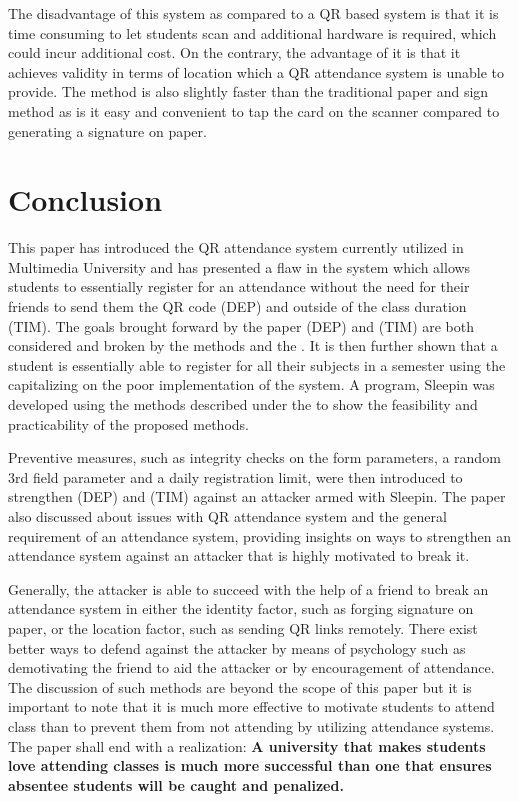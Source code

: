 \documentclass[runningheads]{llncs}
\begin{document}
The disadvantage of this system as compared to a QR based system is that it is time consuming to let students scan and additional hardware is required, which could incur additional cost.
On the contrary, the advantage of it is that it achieves validity in terms of location which a QR attendance system is unable to provide. The method is also slightly faster than the traditional paper and sign method as is it easy and convenient to tap the card on the scanner compared to generating a signature on paper.

\clearpage{}

\section{Conclusion}
This paper has introduced the QR attendance system currently utilized in Multimedia University and has presented a flaw in the system which allows students to essentially register for an attendance without the need for their friends to send them the QR code (DEP) and outside of the class duration (TIM). The goals brought forward by the paper (DEP) and (TIM) are both considered and broken by the methods \theattack{} and the \scanattack{}. It is then further shown that a student is essentially able to register for all their subjects in a semester using the \scanattack{} capitalizing on the poor implementation of the system. A program, Sleepin was developed using the methods described under the \scanattack{} to show the feasibility and practicability of the proposed methods.

Preventive measures, such as integrity checks on the form parameters, a random 3rd field parameter and a daily registration limit, were then introduced to strengthen (DEP) and (TIM) against an attacker armed with Sleepin. The paper also discussed about issues with QR attendance system and the general requirement of an attendance system, providing insights on ways to strengthen an attendance system against an attacker that is highly motivated to break it.

Generally, the attacker is able to succeed with the help of a friend to break an attendance system in either the identity factor, such as forging signature on paper, or the location factor, such as sending QR links remotely. There exist better ways to defend against the attacker by means of psychology such as demotivating the friend to aid the attacker or by encouragement of attendance. The discussion of such methods are beyond the scope of this paper but it is important to note that it is much more effective to motivate students to attend class than to prevent them from not attending by utilizing attendance systems. The paper shall end with a realization: \textbf{A university that makes students love attending classes is much more successful than one that ensures absentee students will be caught and penalized.}
\end{document}
